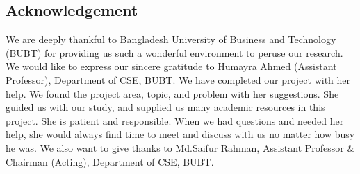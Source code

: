 \begin{center}
    \section*{Acknowledgement}
\end{center}
\large We are deeply thankful to Bangladesh University of Business and Technology (BUBT) for providing us such a wonderful environment to peruse our research. We would like to express our sincere gratitude to Humayra Ahmed (Assistant Professor), Department of CSE, BUBT. We have completed our project with her help. We found the project area, topic, and problem with her suggestions. She guided us with our study, and supplied us many academic resources in this project. She is patient and responsible. When we had questions and needed her help, she would always find time to meet and discuss with us no matter how busy he was. We also want to give thanks to Md.Saifur Rahman, Assistant Professor \& Chairman (Acting), Department of CSE, BUBT.